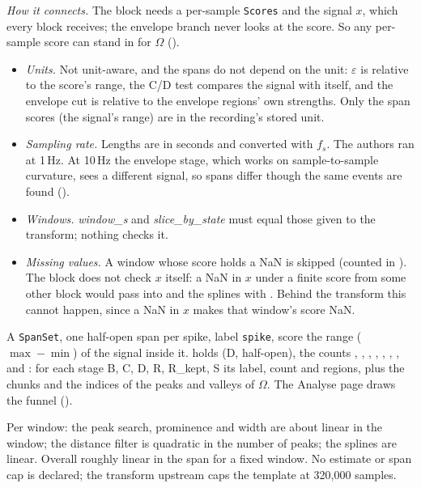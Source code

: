 \emph{How it connects.} The block needs a per-sample \texttt{Scores} and the signal $x$, which
every block receives; the envelope branch never looks at the score. So any per-sample score
can stand in for $\Omega$ ().

\begin{itemize}
\item \emph{Units.} Not unit-aware, and the spans do not depend on the unit: $\varepsilon$ is
  relative to the score's range, the C/D test compares the signal with itself, and the
  envelope cut is relative to the envelope regions' own strengths. Only the span scores (the
  signal's range) are in the recording's stored unit.
\item \emph{Sampling rate.} Lengths are in seconds and converted with $f_s$. The authors ran at
  1\,Hz. At 10\,Hz the envelope stage, which works on sample-to-sample curvature, sees a
  different signal, so spans differ though the same events are found
  ().
\item \emph{Windows.} \emph{window\_s} and \emph{slice\_by\_state} must equal those given to the
  transform; nothing checks it.
\item \emph{Missing values.} A window whose score holds a NaN is skipped (counted in
  ). The block does not check $x$ itself: a NaN in $x$ under a finite
  score from some other block would pass into  and the splines with
  . Behind the transform this cannot happen, since a NaN in
  $x$ makes that window's score NaN.
\end{itemize}

A \texttt{SpanSet}, one half-open span per spike, label \texttt{spike}, score the range
($\max - \min$) of the signal inside it.  holds  (D, half-open),
the counts , , , ,
, , , and : for each
stage B, C, D, R, R\_kept, S its label, count and regions, plus the chunks and the indices of
the peaks and valleys of $\Omega$. The Analyse page draws the funnel
().

Per window: the peak search, prominence and width are about linear in the window; the
distance filter is quadratic in the number of peaks; the splines are linear. Overall roughly
linear in the span for a fixed window. No estimate or span cap is declared; the transform
upstream caps the template at 320{,}000 samples.


